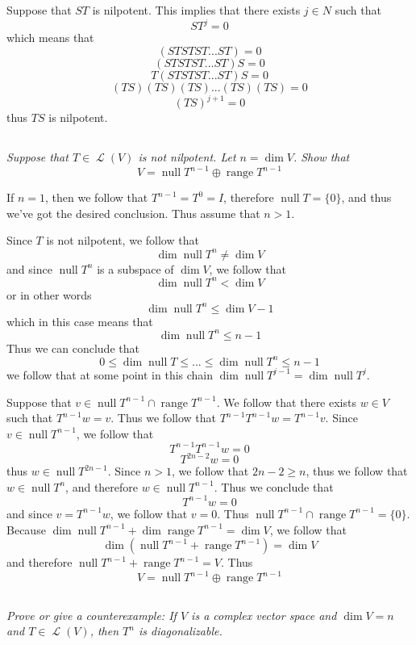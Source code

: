 \documentclass[11pt,oneside,titlepage]{book}
\DeclareMathOperator \map {\mathcal {L}}
\DeclareMathOperator \ns {null}
\DeclareMathOperator \range {range}
\begin{document}
Suppose that $ST$ is nilpotent. This implies that there exists $j \in N$ such that
$$ST^j = 0$$
which means that 
$$(ST ST ST ... ST) = 0$$
$$(ST ST ST ... ST)S = 0$$
$$T(ST ST ST ... ST)S = 0$$
$$(TS) (TS) (TS) ... (TS) (TS) = 0$$
$$(TS)^{j + 1}= 0$$
thus $TS$ is nilpotent.

\subsection{}

\textit{Suppose that $T \in \map(V)$ is not nilpotent. Let $n = \dim V$. Show that
  $$V = \ns T^{n - 1} \oplus \range T^{n - 1}$$}

If $n = 1$, then we follow that $T^{n - 1} = T^0 = I$, therefore $\ns T = \{0\}$, and thus
we've got the desired conclusion. Thus assume that $n > 1$.

Since $T$ is not nilpotent, we follow that
$$\dim \ns T^n \neq \dim V$$
and since $\ns T^n$ is a subspace of $\dim V$, we follow that
$$\dim \ns T^n < \dim V$$
or in other words
$$\dim \ns T^n \leq \dim V - 1$$
which in this case means that
$$\dim \ns T^n \leq n - 1$$
Thus we can conclude that 
$$0 \leq \dim \ns T \leq ... \leq \dim \ns T^n \leq n - 1$$
we follow that at some point in this chain $\dim \ns T^{j - 1} = \dim \ns T^j$.

Suppose that $v \in \ns T^{n - 1} \cap \range T^{n - 1}$. We follow that there exists
$w \in V$ such that $T^{n - 1} w = v$. Thus we follow that
$T^{n - 1}T^{n - 1} w = T^{n - 1}v$. Since $ v \in \ns T^{n - 1}$, we follow that
$$T^{n - 1}T^{n - 1} w = 0$$
$$T^{2n - 2} w = 0$$
thus $w \in \ns T^{2n - 1}$. Since $n > 1$, we follow that $2n - 2 \geq n$, thus we follow that
$w \in \ns T^{n}$, and therefore $w \in \ns T^{n - 1}$. Thus we conclude that
$$T^{n - 1}w = 0$$
and since $v = T^{n - 1}w$, we follow that $v = 0$. Thus
$\ns T^{n - 1} \cap \range T^{n - 1} = \{0\}$. Because
$\dim \ns T^{n - 1} + \dim \range  T^{n - 1} = \dim V$, we follow that
$$\dim (\ns T^{n - 1} +  \range  T^{n - 1}) = \dim V$$
and therefore $\ns T^{n - 1} +  \range  T^{n - 1} = V$. Thus
$$V = \ns T^{n - 1} \oplus  \range  T^{n - 1}$$

\subsection{}

\textit{Prove or give a counterexample: If $V$ is a complex vector space and
  $\dim V = n$ and $T \in \map(V)$, then $T^n$ is diagonalizable.}
\end{document}
